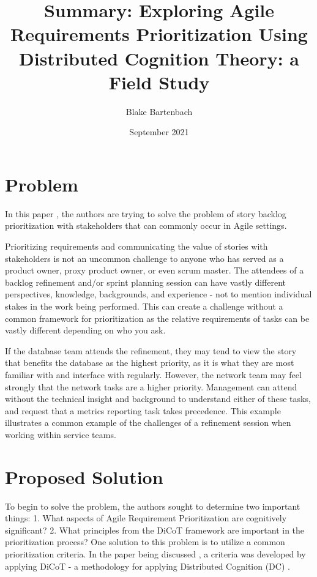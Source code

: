 \documentclass{article}
\title{Summary: Exploring Agile Requirements Prioritization Using Distributed Cognition Theory: a Field Study}
\author{Blake Bartenbach}
\date{September 2021}
\begin{document}
\maketitle

\section{Problem}
In this paper \cite{buchan2020applying}, the authors are trying to solve the problem of story backlog prioritization with stakeholders that can commonly occur in Agile settings.

Prioritizing requirements and communicating the value of stories with stakeholders is not an uncommon challenge to anyone who has served as a product owner, proxy product owner, or even scrum master. The attendees of a backlog refinement and/or sprint planning session can have vastly different perspectives, knowledge, backgrounds, and experience - not to mention individual stakes in the work being performed. This can create a challenge without a common framework for prioritization as the relative requirements of tasks can be vastly different depending on who you ask.

If the database team attends the refinement, they may tend to view the story that benefits the database as the highest priority, as it is what they are most familiar with and interface with regularly. However, the network team may feel strongly that the network tasks are a higher priority. Management can attend without the technical insight and background to understand either of these tasks, and request that a metrics reporting task takes precedence. This example illustrates a common example of the challenges of a refinement session when working within service teams.

\section{Proposed Solution}
To begin to solve the problem, the authors sought to determine two important things:
1. What aspects of Agile Requirement Prioritization are cognitively significant?
2. What principles from the DiCoT framework are important in the prioritization process?
One solution to this problem is to utilize a common prioritization criteria. In the paper being discussed \cite{buchan2020applying}, a criteria was developed by applying DiCoT \cite{blandford2005dicot} - a methodology for applying Distributed Cognition (DC) \cite{hutchins2000distributed}.
\end{document}
